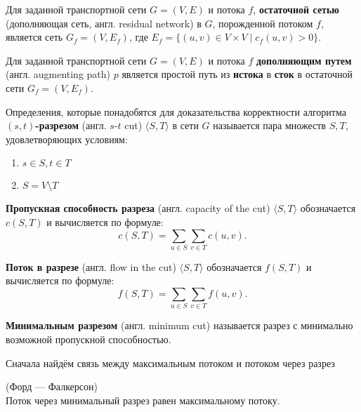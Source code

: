\begin{definition}
	Для заданной транспортной сети $G=(V,E)$ и потока $f$, \textbf{остаточной сетью} (дополняющая сеть, англ. residual network) в $G$, порожденной потоком $f$, является сеть $G_f=(V,E_f)$, где $E_f=\{(u,v) \in V \times V \mid c_f(u,v) > 0\}$.
\end{definition}

\begin{definition}
	Для заданной транспортной сети $G=(V,E)$ и потока $f$ \textbf{дополняющим путем} (англ. augmenting path) $p$ является простой путь из \textbf{истока} в \textbf{сток} в остаточной сети $G_f=(V,E_f)$.
\end{definition}

\begin{definition}
	
Определения, которые понадобятся для доказательства корректности алгоритма
\textbf{$(s,t)$-разрезом} (англ. $s$-$t$ cut) $\langle S,T \rangle$ в сети $G$ называется пара множеств $S, T$, удовлетворяющих условиям:
\begin{enumerate}
	\item $s \in S, t \in T$
	\item $S = V \setminus T$
\end{enumerate}
\end{definition}

\begin{definition}
\textbf{Пропускная способность разреза} (англ. capacity of the cut) $\langle S,T \rangle$ обозначается $c(S,T)$ и вычисляется по формуле:
$$c(S,T) = \sum_{u \in S} \sum_{v \in T} c(u, v).$$
\end{definition}

\begin{definition}
	\textbf{Поток в разрезе }(англ. flow in the cut) $\langle S,T \rangle$ обозначается $f(S,T)$ и вычисляется по формуле:
	$$f(S,T) = \sum_{u \in S} \sum_{v \in T} f(u, v).$$
\end{definition}
 


\begin{definition}
	\textbf{Минимальным разрезом} (англ. minimum cut) называется разрез с минимально возможной пропускной способностью.
	
\end{definition}

Сначала найдём связь между максимальным потоком и потоком через разрез

\begin{theorem}{(Форд --- Фалкерсон)}\\
	Поток через минимальный разрез равен максимальному потоку.
\end{theorem}

